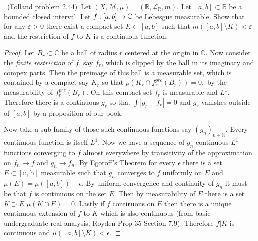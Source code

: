 \documentclass[11pt]{amsart}
\theoremstyle{definition}
\numberwithin{theorem}{section}
\numberwithin{definition}{section}
\numberwithin{equation}{section}
\def\reals{{\mathbb R}}
\def\complex{{\mathbb C}\/}
\def\eps{\varepsilon}
\def\scriptm{{\mathcal M}}
\def\scriptl{{\mathcal L}}
\begin{document}
\medskip {}\ (Folland problem 2.44)\ 
Let $(X,\scriptm,\mu) = (\reals,\scriptl_\reals,m)$.
Let $[a,b]\subset\reals$ be a bounded closed interval. 
Let $f:[a,b]\to\complex$ be Lebesgue measurable. Show that for any $\eps>0$
there exist a compact set $K\subset[a,b]$ 
such that $m([a,b]\setminus K)<\eps$ and the restriction of $f$ to $K$
is a continuous function. 
\begin{proof}
	Let $B_r \subset \mathbb{C}$ be a ball of radius $r$ centered at the origin in $\mathbb{C}$. Now consider the \emph{finite restriction} of $f$, say $f_r$, which is clipped by the ball in its imaginary and compex parts. Then the preimage of this ball is a measurable set, which is contained by a compact say $K_r$ so that
	$\mu(K_r \cap f_r^{pre}(B_r)) = 0,$ by the measurability of $f_r^{pre}(B_r).$ On this compact set $f_r$ is measurable and $L^1$. Therefore there is a continuous $g_r$ so that $\int |g_r -f_r| = 0$ and $g_r$ vanishes outside of $[a,b]$ by a proposition of our book.

	Now take a sub family of those such continuous functions say $(g_n)_{n\in \mathbb{N}}.$ Every continuous function is itself $L^1$. Now we have a sequence of $g_n$ continuous $L^1$ functions converging to $f$ almost everywhere by transitivity of the approximation on $f_n \to f$ and $g_n \to f_n$. By Egoroff's Theorem for every $\epsilon$ there is a set $E \subset \mathbb{[a,b]}$ measurable such that $g_n$ converges to $f$ uniformly on $E$ and $\mu(E) = \mu([a,b]) - \epsilon.$ By uniform convergence and continuity of $g_n$ it must be that $f$ is continuous on the set $E$. Then by measurability of $E$ there is a set $K \supset E$ $\mu(K \cap E) = 0$. Lastly if $f$ continuous on $E$ then there is a unique continuous extension of $f$ to $K$ which is also continuous (from basic undergraduate real analysis, Royden Prop 35 Section 7.9). Therefore $f|K$ is continuous and $\mu([a,b] \setminus K) < \epsilon.$ 
\end{proof}
\end{document}
